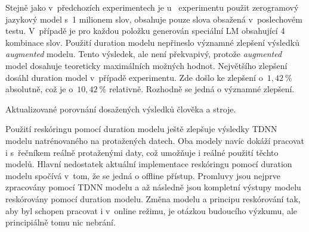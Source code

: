Stejně jako v~předchozích experimentech je u~ experimentu použit zerogramový jazykový model s~1 milionem slov,  obsahuje pouze slova obsažená v~poslechovém testu. V~případě  je pro každou položku generován speciální LM obsahující 4 kombinace slov. Použití duration modelu nepřineslo významné zlepšení výsledků \textit{augmented} modelu. Tento výsledek, ale není překvapivý, protože \textit{augmented} model dosahuje teoreticky maximálních možných hodnot. Největšího zlepšení dosáhl duration model v~případě  experimentu. Zde došlo ke zlepšení o~$1,42~\%$ absolutně, což je o~$10,42~\%$ relativně. Rozhodně se jedná o významné zlepšení.

\begin{table}[htpb]
  \centering
  \def\arraystretch{1.5}
  \caption{Aktualizované porovnání dosažených výsledků člověka a stroje.}
  \label{tab:realisation:duration:comparison}
\end{table}

Použití reskóringu pomocí duration modelu ještě zlepšuje výsledky TDNN modelu natrénovaného na protažených datech. Oba modely navíc dokáží pracovat i s~řečníkem reálně protaženými daty, což umožňuje i reálné použití těchto modelů. Hlavní nedostatek aktuální implementace reskóringu pomocí duration modelu spočívá v~tom, že se jedná o offline přístup. Promluvy jsou nejprve zpracovány pomocí TDNN modelu a až následně jsou kompletní výstupy modelu reskórovány pomocí duration modelu. Změna modelu a principu reskórování tak, aby byl schopen pracovat i v~online režimu, je otázkou budoucího výzkumu, ale principiálně tomu nic nebrání.
